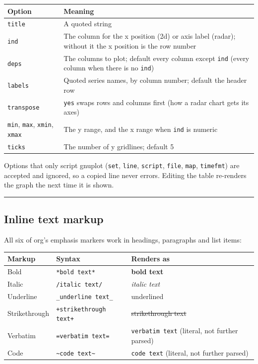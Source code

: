 \documentclass[11pt]{article}
\begin{document}
\begin{center}
\begin{tabular}{ll}
Option & Meaning\\[0pt]
\hline
\texttt{title} & A quoted string\\[0pt]
\texttt{ind} & The column for the x position (2d) or axis label (radar); without it the x position is the row number\\[0pt]
\texttt{deps} & The columns to plot; default every column except \texttt{ind} (every column when there is no \texttt{ind})\\[0pt]
\texttt{labels} & Quoted series names, by column number; default the header row\\[0pt]
\texttt{transpose} & \texttt{yes} swaps rows and columns first (how a radar chart gets its axes)\\[0pt]
\texttt{min}, \texttt{max}, \texttt{xmin}, \texttt{xmax} & The y range, and the x range when \texttt{ind} is numeric\\[0pt]
\texttt{ticks} & The number of y gridlines; default 5\\[0pt]
\end{tabular}
\end{center}

Options that only script gnuplot (\texttt{set}, \texttt{line}, \texttt{script}, \texttt{file}, \texttt{map}, \texttt{timefmt}) are accepted and ignored, so a copied line never errors. Editing the table re-renders the graph the next time it is shown.

\noindent\rule{\textwidth}{0.5pt}

\subsection{Inline text markup}
\label{sec:org87db50b}
All six of org's emphasis markers work in headings, paragraphs and list items:

\begin{center}
\begin{tabular}{lll}
Markup & Syntax & Renders as\\[0pt]
\hline
Bold & \texttt{*bold text*} & \textbf{bold text}\\[0pt]
Italic & \texttt{/italic text/} & \emph{italic text}\\[0pt]
Underline & \texttt{\_underline text\_} & underlined\\[0pt]
Strikethrough & \texttt{+strikethrough text+} & \sout{strikethrough text}\\[0pt]
Verbatim & \texttt{=verbatim text=} & \texttt{verbatim text} (literal, not further parsed)\\[0pt]
Code & \texttt{\textasciitilde{}code text\textasciitilde{}} & \texttt{code text} (literal, not further parsed)\\[0pt]
\end{tabular}
\end{center}
\end{document}
